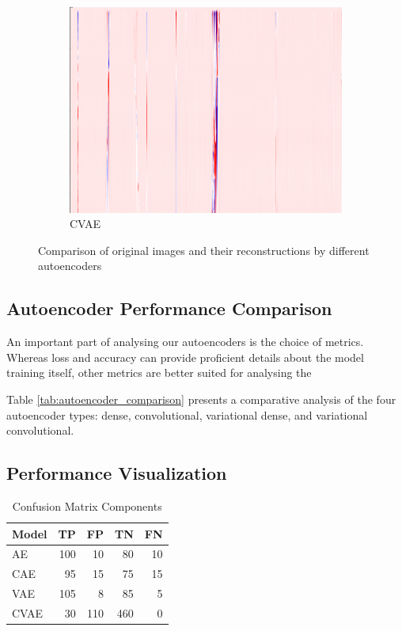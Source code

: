 \begin{figure}[!h]
\begin{subfigure}{0.33\textwidth}
        \includegraphics[width=\textwidth]{figures/test.png}
        \caption{CVAE}
    \end{subfigure}
    
    \caption{Comparison of original images and their reconstructions by different autoencoders}
    \label{fig:aereconstruct}
\end{figure}

\subsection{Autoencoder Performance Comparison}

An important part of analysing our autoencoders is the choice of metrics. Whereas loss and accuracy can provide proficient details about the model training itself, other metrics are better suited for analysing the 

Table \ref{tab:autoencoder_comparison} presents a comparative analysis of the four autoencoder types: dense, convolutional, variational dense, and variational convolutional.



\subsection{Performance Visualization}


\begin{table}[!h]
\centering
\begin{tabular}{l|rrrr}
\toprule
\textbf{Model} & \textbf{TP} & \textbf{FP} & \textbf{TN} & \textbf{FN} \\
\midrule
AE  & 100 & 10 & 80 & 10 \\
CAE  & 95 & 15 & 75 & 15 \\
VAE  & 105 & 8 & 85 & 5 \\
CVAE & 30 & 110 & 460 & 0 \\
\bottomrule
\end{tabular}
\caption{Confusion Matrix Components}
\end{table}

